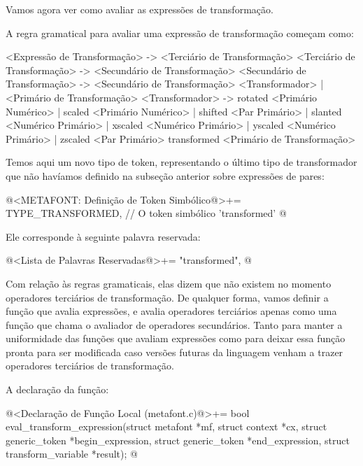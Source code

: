 Vamos agora ver como avaliar as expressões de transformação.


A regra gramatical para avaliar uma expressão de transformação começam
como:

\alinhaverbatim
<Expressão de Transformação> -> <Terciário de Transformação>
<Terciário de Transformação> -> <Secundário de Transformação>
<Secundário de Transformação> -> <Secundário de Transformação> <Transformador> |
                                 <Primário de Transformação>
<Transformador> -> rotated <Primário Numérico> |
                   scaled <Primário Numérico> |
                   shifted <Par Primário> |
                   slanted <Numérico Primário> |
                   xscaled <Numérico Primário> |
                   yscaled <Numérico Primário> |
                   zscaled <Par Primário>
                   transformed <Primário de Transformação>
\alinhanormal

Temos aqui um novo tipo de token, representando o último tipo de
transformador que não havíamos definido na subseção anterior sobre
expressões de pares:

\iniciocodigo
@<METAFONT: Definição de Token Simbólico@>+=
TYPE_TRANSFORMED,  // O token simbólico 'transformed'
@
\fimcodigo

Ele corresponde à seguinte palavra reservada:

\iniciocodigo
@<Lista de Palavras Reservadas@>+=
"transformed",
@
\fimcodigo

Com relação às regras gramaticais, elas dizem que não existem no
momento operadores terciários de transformação. De qualquer forma,
vamos definir a função que avalia expressões, e avalia operadores
terciários apenas como uma função que chama o avaliador de operadores
secundários. Tanto para manter a uniformidade das funções que avaliam
expressões como para deixar essa função pronta para ser modificada
caso versões futuras da linguagem venham a trazer operadores
terciários de transformação.

A declaração da função:

\iniciocodigo
@<Declaração de Função Local (metafont.c)@>+=
bool eval_transform_expression(struct metafont *mf, struct context *cx,
                               struct generic_token *begin_expression,
                               struct generic_token *end_expression,
                               struct transform_variable *result);
@
\fimcodigo


